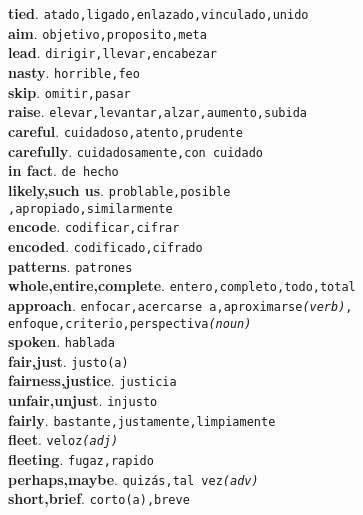 \documentclass[twocolumn]{article}
\begin{document}
	\textsf{\textbf{tied}}. \texttt{atado,ligado,enlazado,vinculado,unido}\\
	\textsf{\textbf{aim}}. \texttt{objetivo,proposito,meta}\\
	\textsf{\textbf{lead}}. \texttt{dirigir,llevar,encabezar}\\
	\textsf{\textbf{nasty}}. \texttt{horrible,feo}\\
	\textsf{\textbf{skip}}. \texttt{omitir,pasar}\\
	\textsf{\textbf{raise}}. \texttt{elevar,levantar,alzar,aumento,subida}\\
	\textsf{\textbf{careful}}. \texttt{cuidadoso,atento,prudente}\\
	\textsf{\textbf{carefully}}. \texttt{cuidadosamente,con cuidado}\\
	\textsf{\textbf{in fact}}. \texttt{de hecho}\\
	\textsf{\textbf{likely,such us}}. \texttt{problable,posible\\,apropiado,similarmente}\\
	\textsf{\textbf{encode}}. \texttt{codificar,cifrar}\\
	\textsf{\textbf{encoded}}. \texttt{codificado,cifrado}\\
	\textsf{\textbf{patterns}}. \texttt{patrones}\\
	\textsf{\textbf{whole,entire,complete}}. \texttt{entero,completo,todo,total}\\
	\textsf{\textbf{approach}}. \texttt{enfocar,acercarse a,aproximarse{\scriptsize \textsl{(verb)}},\\enfoque,criterio,perspectiva{\scriptsize \textsl{(noun)}}}\\
	\textsf{\textbf{spoken}}. \texttt{hablada}\\
	\textsf{\textbf{fair,just}}. \texttt{justo(a)}\\
	\textsf{\textbf{fairness,justice}}. \texttt{justicia}\\
	\textsf{\textbf{unfair,unjust}}. \texttt{injusto}\\
	\textsf{\textbf{fairly}}. \texttt{bastante,justamente,limpiamente}\\
	\textsf{\textbf{fleet}}. \texttt{veloz{\scriptsize \textsl{(adj)}}}\\
	\textsf{\textbf{fleeting}}. \texttt{fugaz,rapido}\\
	\textsf{\textbf{perhaps,maybe}}. \texttt{quiz\'as,tal vez{\scriptsize \textsl{(adv)}}}\\
	\textsf{\textbf{short,brief}}. \texttt{corto(a),breve}\\
\end{document}
